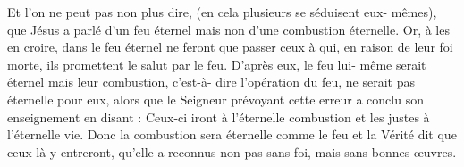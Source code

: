 Et l’on ne peut pas non plus dire, (en cela plusieurs se séduisent eux- mêmes), que Jésus a parlé d’un feu éternel mais non d’une combustion éternelle. Or, à les en croire, dans le feu éternel ne feront que passer ceux à qui, en raison de leur foi morte, ils promettent le salut par le feu. D’après eux, le feu lui- même serait éternel mais leur combustion, c’est-à- dire l’opération du feu, ne serait pas éternelle pour eux, alors que le Seigneur prévoyant cette erreur a conclu son enseignement en disant : Ceux-ci iront à l'éternelle combustion et les justes à l'éternelle vie. Donc la combustion sera éternelle comme le feu et la Vérité dit que ceux-là y entreront, qu'elle a reconnus non pas sans foi, mais sans bonnes œuvres.
